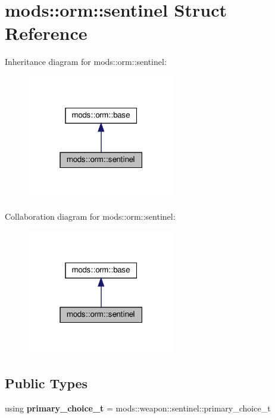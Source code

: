 \hypertarget{structmods_1_1orm_1_1sentinel}{}\section{mods\+:\+:orm\+:\+:sentinel Struct Reference}
\label{structmods_1_1orm_1_1sentinel}


Inheritance diagram for mods\+:\+:orm\+:\+:sentinel\+:
\nopagebreak
\begin{figure}[H]
\begin{center}
\leavevmode
\includegraphics[width=183pt]{structmods_1_1orm_1_1sentinel__inherit__graph}
\end{center}
\end{figure}


Collaboration diagram for mods\+:\+:orm\+:\+:sentinel\+:
\nopagebreak
\begin{figure}[H]
\begin{center}
\leavevmode
\includegraphics[width=183pt]{structmods_1_1orm_1_1sentinel__coll__graph}
\end{center}
\end{figure}
\subsection*{Public Types}
\begin{DoxyCompactItemize}
\item 
\mbox{\label{structmods_1_1orm_1_1sentinel_a9de7b9c1346aa8fb150325bb24f5a71c}} 
using {\bfseries primary\+\_\+choice\+\_\+t} = mods\+::weapon\+::sentinel\+::primary\+\_\+choice\+\_\+t
\end{DoxyCompactItemize}
